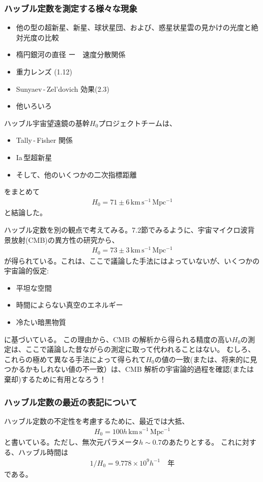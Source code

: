 \documentclass[11pt]{ltjsarticle}
\theoremstyle{plain}
\theoremstyle{break}
\begin{document}
\subsubsection{ハッブル定数を測定する様々な現象}
\begin{itemize}
  \item 他の型の超新星、新星、球状星団、および、惑星状星雲の見かけの光度と絶対光度の比較
  \item 楕円銀河の直径 ー　速度分散関係
  \item 重力レンズ (1.12)
  \item Sunyaev\,-\,Zel'dovich 効果(2.3)
  \item 他いろいろ
\end{itemize}
ハッブル宇宙望遠鏡の基幹$H_0$プロジェクトチームは、
\begin{itemize}
  \item Tally\,-\,Fisher 関係
  \item Ia\,型超新星
  \item そして、他のいくつかの二次指標距離
\end{itemize}
をまとめて
\begin{align}
  H_0 = 71 \pm 6  \,\mathrm{km\,s^{-1}\,Mpc^{-1}}
\end{align}
と結論した。

ハッブル定数を別の観点で考えてみる。7.2節でみるように、宇宙マイクロ波背景放射(CMB)の異方性の研究から、
\begin{align}
  H_0 = 73 \pm 3  \,\mathrm{km\,s^{-1}\,Mpc^{-1}}
\end{align}
が得られている。これは、ここで議論した手法にはよっていないが、いくつかの宇宙論的仮定:
\begin{itemize}
  \item 平坦な空間
  \item 時間によらない真空のエネルギー
  \item 冷たい暗黒物質
\end{itemize}
に基づいている。
この理由から、CMB の解析から得られる精度の高い$H_0$の測定は、ここで議論した昔ながらの測定に取って代われることはない。
むしろ、これらの極めて異なる手法によって得られて$H_0$の値の一致(または、将来的に見つかるかもしれない値の不一致）は、CMB 解析の宇宙論的過程を確認(または棄却)するために有用となろう！

\subsubsection{ハッブル定数の最近の表記について}
ハッブル定数の不定性を考慮するために、最近では大抵、
\begin{align}
  H_0 =  100 h  \,\mathrm{km\,s^{-1}\,Mpc^{-1}}
\end{align}
と書いている。ただし、無次元パラメータ$h \sim 0.7$のあたりとする。
これに対する、ハッブル時間は
\begin{align}
  1/H_0 = 9.778 \times 10^9 h^{-1} \quad \text{年}
\end{align}
である。
\end{document}
